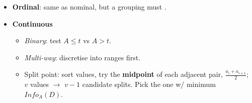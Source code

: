 {\begin{itemize}
  \item \textbf{Ordinal}: same as nominal, but a grouping must .
  \item \textbf{Continuous}
  \begin{itemize}
    \item \emph{Binary}: test $A \le t$ vs $A > t$.
    \item \emph{Multi-way}: discretise into ranges first.
    \item Split point: sort values, try the \textbf{midpoint} of each adjacent pair,
          $\frac{a_i + a_{i+1}}{2}$; $v$ values $\rightarrow$ $v-1$ candidate splits.
          Pick the one w/ minimum $Info_A(D)$.
  \end{itemize}
\end{itemize}}

\vspace{3pt}

